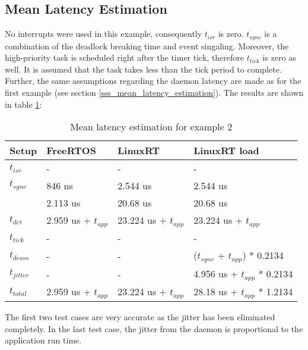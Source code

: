 \subsection{Mean Latency Estimation}\label{sss_mean_latency_estimation2}
No interrupts were used in this example, consequently $t_{isr}$ is zero.
$t_{sync}$ is a combination of the deadlock breaking time and event singaling. 
Moreover, the high-priority task is scheduled right after the timer tick, therefore $t_{tick}$ is zero as well.
It is assumed that the task takes less than the tick period to complete. 
Further, the same assumptions regarding the daemon latency are made as for the first example (see section \ref{sss_mean_latency_estimation}).
The results are shown in table \ref{tab_example2_mean}:
\begin{table}[htbp]
	\centering
		\begin{tabular}{|l|l|l|l|}
			\hline
				Setup					& FreeRTOS 								& LinuxRT 							& LinuxRT load  \\
				\hline 
			 	$t_{isr}$ 		& -				 								& -											& -							\\
			  $t_{sync}$		& 846 ns			  	  			& 2.544 us 				 			& 2.544 us			\\
			  							&	2.113 us								& 20.68 us							& 20.68 us			\\
			  \hline 
			  $t_{det}$			& 2.959 us + $t_{app}$		& 23.224 us + $t_{app}$	& 23.224 us	+ $t_{app}$		\\ 
			  \hline
			  \hline
			  $t_{tick}$		& -												& -					 					  & -													\\
			  $t_{deam}$		& -				  							& - 				 						& ($t_{sync}$ + $t_{app}$) * 0.2134 \\ 
				\hline 
			  $t_{jitter}$	& -				  							& -										  & 4.956 us	+ $t_{app}$ * 0.2134 \\ 
			  \hline
			  \hline 
			  $t_{total}$		& 2.959 us + $t_{app}$	 & 23.224 us + $t_{app}$  &	28.18 us + $t_{app}$ * 1.2134 	\\ 
			\hline
		\end{tabular}
	\caption{Mean latency estimation for example 2}
	\label{tab_example2_mean}
\end{table}
The first two test cases are very accurate as the jitter has been eliminated completely.
In the last test case, the jitter from the daemon is proportional to the application run time.

